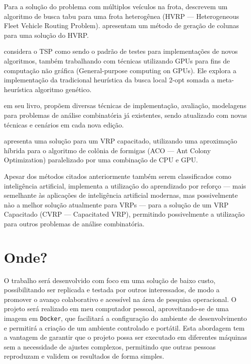 \documentclass[
    openany,
    12pt,
    a4paper,
    twoside,
    english,
    brazil, sumario=tradicional
]{/home/lucas_galdino/Desktop/TCC/planning/abntex2/abntex2}
\let\oldchapter\chapter
\renewcommand{\chapter}{\clearpage\oldchapter}
\begin{document}
Para a solução do problema com múltiplos veículos na frota,  descrevem um algoritmo de busca tabu para uma frota heterogênea (HVRP — Heterogeneous Fleet Vehicle Routing Problem)\@.  apresentam um método de geração de colunas para uma solução do HVRP\@. 

 considera o TSP como sendo o padrão de testes para implementações de novos algoritmos, também trabalhando com técnicas utilizando GPUs para fins de computação não gráfica (General-purpose computing on GPUs). Ele explora a implementação da tradicional heurística da busca local 2-opt somada a meta-heurística algoritmo genético.

 em seu livro, propõem diversas técnicas de implementação, avaliação, modelagens para problemas de análise combinatória já existentes, sendo atualizado com novas técnicas e cenários em cada nova edição.

 apresenta uma solução para um VRP capacitado, utilizando uma aproximação híbrida para o algoritmo de colônia de formigas (ACO — Ant Colony Optimization) paralelizado por uma combinação de CPU e GPU\@.

Apesar dos métodos citados anteriormente também serem classificados como inteligência artificial,  implementa a utilização do aprendizado por reforço — mais semelhante às aplicações de inteligência artificial modernas, mas possivelmente nào a melhor solução atualmente para VRPs — para a solução de um VRP Capacitado (CVRP — Capacitated VRP), permitindo possivelmente a utilização para outros problemas de análise combinatória.

\chapter{Onde?}

O trabalho será desenvolvido com foco em uma solução de baixo custo, possibilitando ser replicada e testada por outros interessados, de modo a promover o avanço colaborativo e acessível na área de pesquisa operacional. O projeto será realizado em meu computador pessoal, aproveitando-se de uma imagem em \verb|Docker|, que facilitará a configuração do ambiente de desenvolvimento e permitirá a criação de um ambiente controlado e portátil. Esta abordagem tem a vantagem de garantir que o projeto possa ser executado em diferentes máquinas sem a necessidade de ajustes complexos, permitindo que outras pessoas reproduzam e validem os resultados de forma simples.
\end{document}
